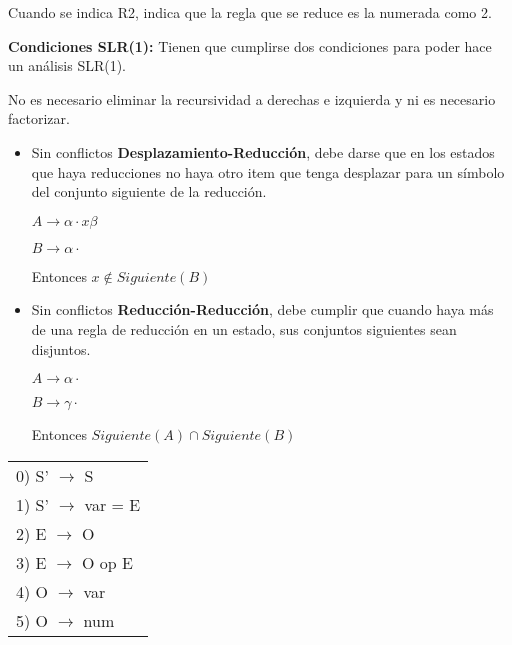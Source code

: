 \documentclass[12pt, twoside, openright]{report} %
\begin{document}
Cuando se indica R2, indica que la regla que se reduce es la numerada como 2.

\textbf{Condiciones SLR(1):}
Tienen que cumplirse dos condiciones para poder hace un análisis SLR(1).

No es necesario eliminar la recursividad a derechas e izquierda y ni es necesario factorizar.

\begin{itemize}
	\item Sin conflictos \textbf{Desplazamiento-Reducción}, debe darse que en los estados que haya reducciones no haya otro item que tenga desplazar para un símbolo del conjunto siguiente de la reducción.

	      $A \rightarrow \alpha \cdot x \beta$

	      $B \rightarrow \alpha \cdot$

	      Entonces $x \notin Siguiente(B)$
	\item Sin conflictos \textbf{Reducción-Reducción}, debe cumplir que cuando haya más de una regla de reducción en un estado, sus conjuntos siguientes sean disjuntos.

	      $A \rightarrow \alpha \cdot $

	      $B \rightarrow \gamma \cdot$

	      Entonces $Siguiente(A) \cap Siguiente(B)$
\end{itemize}

\begin{table}[H]
	\centering
	\begin{tabular}{l}
		0) S' $\rightarrow$ S       \\
		1) S' $\rightarrow$ var = E \\
		2) E $\rightarrow$ O        \\
		3) E $\rightarrow$ O op E   \\
		4) O $\rightarrow$ var      \\
		5) O $\rightarrow$ num
	\end{tabular}
\end{table}
\end{document}
